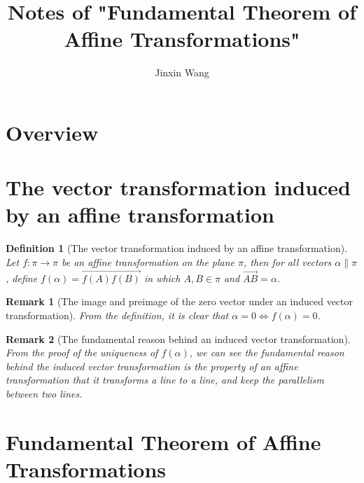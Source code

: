 \documentclass[onecolumn]{ctexart}
\title{Notes of "Fundamental Theorem of Affine Transformations"}
\author{Jinxin Wang}
\date{}
\newtheorem{definition}{Definition}
\newtheorem{remark}{Remark}
\begin{document}
\maketitle

\section{Overview}

\section{The vector transformation induced by an affine transformation}

\begin{definition}[The vector transformation induced by an affine transformation]
  Let $f: \pi \to \pi$ be an affine transformation on the plane $\pi$, then for 
  all vectors $\alpha \parallel \pi$, define $f(\alpha) = \vec{f(A)f(B)}$ in 
  which $A, B \in \pi$ and $\vec{AB} = \alpha$.
\end{definition}
\begin{remark}[The image and preimage of the zero vector under an induced vector transformation]
  From the definition, it is clear that $\alpha = 0 \Leftrightarrow f(\alpha) = 
  0$.
\end{remark}
\begin{remark}[The fundamental reason behind an induced vector transformation]
  From the proof of the uniqueness of $f(\alpha)$, we can see the fundamental 
  reason behind the induced vector transformation is the property of an affine 
  transformation that it transforms a line to a line, and keep the parallelism 
  between two lines.
\end{remark}

\section{Fundamental Theorem of Affine Transformations}
\end{document}
